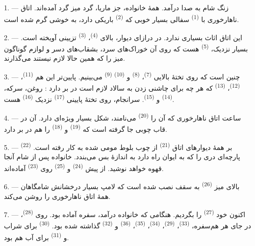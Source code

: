 \VUsaut{3.6mm}
\VUsaut{3.0mm}

1. --- زنگ شام به صدا درآمد. همهٔ خانواده، جز ماریا، گرد میز گرد
آمده‌اند. اتاق ناهارخوری با  \textsuperscript{(1)} سفالی
بسیار خوبی که  \textsuperscript{(2)} باریکی دارد، به
خوشی گرم شده است.

2. --- این اتاق اثاث بسیاری ندارد. در درازای دیوار، بالای  \textsuperscript{(4)}،  \textsuperscript{(3)}
تزیینی آویخته است. بسیار نزدیک،  \textsuperscript{(5)}
هست که روی آن خوراک‌های سرد، بشقاب‌های دسر و لوازم گوناگون میز را که
همین حالا لازم نیستند می‌گذارند.

3. --- چنین است که روی تختهٔ بالایی 
\textsuperscript{(7)}،  \textsuperscript{(8)} و
 \textsuperscript{(10)}  \textsuperscript{(9)}
می‌بینیم. پایین‌تر این هم  \textsuperscript{(11)}،
 \textsuperscript{(12)}، 
\textsuperscript{(13)} که هر چه برای چاشنی زدن به سالاد لازم است در بر
دارد : روغن، سرکه،  \textsuperscript{(14)} و
 \textsuperscript{(15)}. سرانجام، روی تختهٔ پایینی
 \textsuperscript{(17)} نزدیک 
\textsuperscript{(16)} هست.

4. --- ساعت اتاق ناهارخوری که آن را 
\textsuperscript{(20)} می‌نامند، شکل بسیار ویژه‌ای دارد. آن در قاب چوبی
جا گرفته است که  \textsuperscript{(19)} و
 \textsuperscript{(18)} را هم در بر دارد.

\VUsaut{4.6mm}
\VUsaut{3.0mm}

5. --- بر همهٔ دیوارهای اتاق  \textsuperscript{(21)}
از چوب بلوط مومی شده به کار رفته است. 
\textsuperscript{(22)} پارچه‌ای دری را که به ایوان راه دارد به اندازهٔ
بس می‌بندد. خانواده پس از شام آنجا قهوه خواهد نوشید. از پیش
 \textsuperscript{(24)} و 
\textsuperscript{(25)} روی  \textsuperscript{(23)}
آماده‌اند.

6. --- بالای میز  \textsuperscript{(26)} به سقف نصب
شده است که لامپ بسیار درخشانش شامگاهان همهٔ اتاق ناهارخوری را روشن
می‌کند.

7. --- اکنون خود  \textsuperscript{(27)} را
بگردیم. هنگامی که خانواده درآمد، سفره آماده بود. روی 
\textsuperscript{(28)}، در جای هر هم‌سفره، 
\textsuperscript{(33)}،  \textsuperscript{(29)}،
 \textsuperscript{(34)}، 
\textsuperscript{(35)}،  \textsuperscript{(36)} و
 \textsuperscript{(32)} گذاشته شده بود.
 \textsuperscript{(30)} برای شراب و 
\textsuperscript{(31)} برای آب هم بود.

